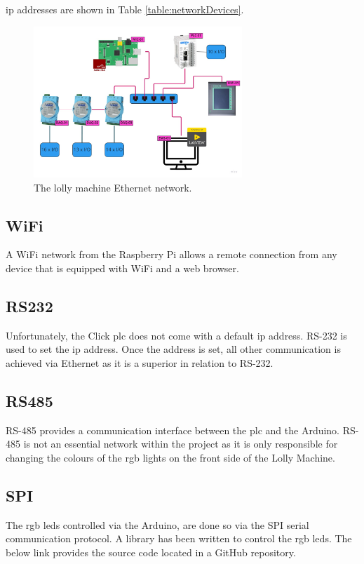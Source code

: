     \acrshort{ip} addresses are shown in Table \ref{table:networkDevices}.	

        \begin{figure}[H]
            \centering
            \includegraphics[width = 0.7\textwidth]{2_images/ethernetLollyMachine.png}
            \caption{The lolly machine Ethernet network.}
            \label{fig:ethernetLollyMachine}
        \end{figure}
    
    \subsection{WiFi}
    A WiFi network from the Raspberry Pi allows a remote connection from any device that is equipped with WiFi and a web browser. 
    
    \subsection{RS232}
    Unfortunately, the Click \acrshort{plc} does not come with a default \acrshort{ip} address. RS-232 is used to set the \acrshort{ip} address. Once the address is set, all other communication is achieved via Ethernet as it is a superior in relation to RS-232.
    
    \subsection{RS485}
    RS-485 provides a communication interface between the \acrshort{plc} and the Arduino. RS-485 is not an essential network within the project as it is only responsible for changing the colours of the \acrshort{rgb} lights on the front side of the Lolly Machine.
    
    \subsection{SPI}
    The \acrshort{rgb} \acrshort{led}s controlled via the Arduino, are done so via the SPI serial communication protocol. A library has been written to control the \acrshort{rgb} \acrshort{led}s. The below link provides the source code located in a GitHub repository.
    
